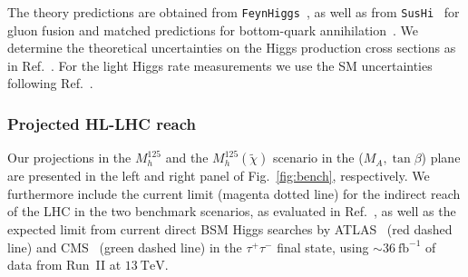 The theory predictions are obtained from
\texttt{FeynHiggs}~\cite{Heinemeyer:1998yj,Heinemeyer:1998np,Degrassi:2002fi,Frank:2006yh,Hahn:2013ria,Bahl:2016brp,Bahl:2017aev,Bahl:2018qog},
as well as from \texttt{SusHi}~\cite{Harlander:2012pb, Harlander:2016hcx,
Harlander:2005rq,Harlander:2002wh,
Harlander:2002vv,Anastasiou:2014lda,Anastasiou:2015yha,
Anastasiou:2016cez,Degrassi:2010eu, Degrassi:2011vq,
Degrassi:2012vt,Actis:2008ug}
for gluon fusion and matched predictions for bottom-quark
annihilation~\cite{Bonvini:2015pxa,Bonvini:2016fgf,Forte:2015hba, Forte:2016sja}. We determine the theoretical uncertainties on the Higgs production cross sections as in Ref.~\cite{Bahl:2018zmf}. 
For the light Higgs rate measurements we use the SM uncertainties following Ref.~\cite{deFlorian:2016spz}.

\subsubsection{Projected HL-LHC reach}
 
Our projections in the $M_h^{125}$ and the $M_h^{125}(\tilde{\chi})$ scenario in the
($M_A, \tan\beta$) plane are presented in the left and right panel of Fig.~\ref{fig:bench}, respectively. 
We furthermore include the current limit (magenta dotted line) for the indirect reach of the LHC in the two benchmark scenarios, as evaluated in Ref.~\cite{Bahl:2018zmf}, as well as the expected limit from current direct BSM Higgs searches by ATLAS~\cite{Aaboud:2017sjh} (red dashed line) and CMS~\cite{Sirunyan:2018zut} (green dashed line) in the $\tau^+\tau^-$ final state, using $\sim 36~\mathrm{fb}^{-1}$ of data from Run~II at $13~\mathrm{TeV}$.


